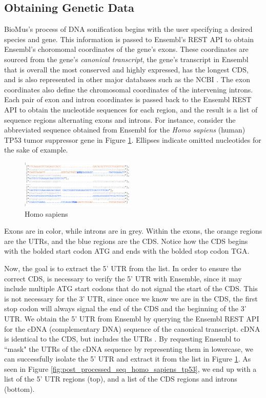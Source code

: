 \documentclass[letterpaper]{article}
\begin{document}
\subsection{Obtaining Genetic Data}
BioMus's process of DNA sonification begins with the user specifying a desired species and gene. This information is passed to Ensembl's REST API to obtain Ensembl's choromomal coordinates of the gene's exons. These coordinates are sourced from the gene's \textit{canonical transcript}, the gene's transcript in Ensembl that is overall the most conserved and highly expressed, has the longest CDS, and is also represented in other major databases such as the NCBI \cite{ensembl_transcript_flags}. The exon coordinates also define the chromosomal coordinates of the intervening introns. Each pair of exon and intron coordinates is passed back to the Ensembl REST API to obtain the nucleotide sequences for each region, and the result is a list of sequence regions alternating exons and introns. For instance, consider the abbreviated sequence obtained from Ensembl for the \textit{Homo sapiens} (human) TP53 tumor suppressor gene in Figure \ref{fig:pre_processed_seq_homo_sapiens_tp53}. Ellipses indicate omitted nucleotides for the sake of example.

\begin{figure}[h!]
\centering
\includegraphics[width=0.48\textwidth]{images/pre_processed_seq_homo_sapiens_tp53_ABBREV}
  \caption{Homo sapiens}\label{fig:pre_processed_seq_homo_sapiens_tp53}
  \vspace{-3mm}
\end{figure}

Exons are in color, while introns are in grey. Within the exons, the orange regions are the UTRs, and the blue regions are the CDS. Notice how the CDS begins with the bolded start codon ATG and ends with the bolded stop codon TGA. 

Now, the goal is to extract the 5' UTR from the list. In order to ensure the correct CDS, is necessary to verify the 5' UTR with Ensemble, since it may include multiple ATG start codons that do not signal the start of the CDS. This is not necessary for the 3' UTR, since once we know we are in the CDS, the first stop codon will always signal the end of the CDS and the beginning of the 3' UTR. We obtain the 5' UTR from Ensembl by querying the Ensembl REST API for the cDNA (complementary DNA) sequence of the canonical transcript. cDNA is identical to the CDS, but includes the UTRs \cite{ensembl_glossary}. By requesting Ensembl to ``mask" the UTRs of the cDNA sequence by representing them in lowercase, we can successfully isolate the 5' UTR and extract it from the list in Figure \ref{fig:pre_processed_seq_homo_sapiens_tp53}. As seen in Figure \ref{fig:post_processed_seq_homo_sapiens_tp53}, we end up with a list of the 5' UTR regions (top), and a list of the CDS regions and introns (bottom).\cite{10.1162/artl_a_00325}
\end{document}
